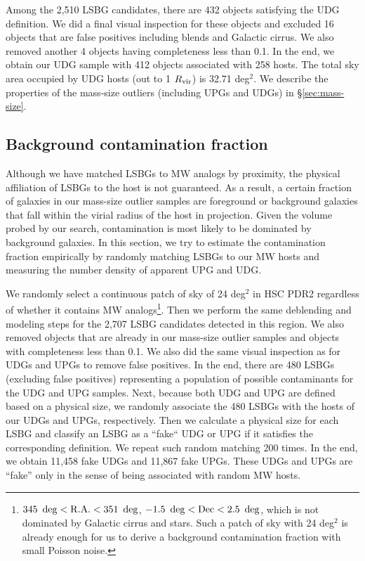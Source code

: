 \documentclass[twocolumn,astrosymb,twocolappendix]{aastex631}
\begin{document}
\begin{CJK*}{UTF8}{gbsn}
Among the 2,510 LSBG candidates, there are 432 objects satisfying the UDG definition. We did a final visual inspection for these objects and excluded 16 objects that are false positives including blends and Galactic cirrus. We also removed another 4 objects having completeness less than 0.1. In the end, we obtain our UDG sample with 412 objects associated with 258 hosts. The total sky area occupied by UDG hosts (out to 1 $R_{\rm{vir}}$) is 32.71 deg$^{2}$. We describe the properties of the mass-size outliers (including UPGs and UDGs) in \S\ref{sec:mass-size}.

\subsection{Background contamination fraction}\label{sec:bkg}
Although we have matched LSBGs to MW analogs by proximity, the physical affiliation of LSBGs to the host is not guaranteed. As a result, a certain fraction of galaxies in our mass-size outlier samples are foreground or background galaxies that fall within the virial radius of the host in projection. Given the volume probed by our search, contamination is most likely to be dominated by background galaxies. In this section, we try to estimate the contamination fraction empirically by randomly matching LSBGs to our MW hosts and measuring the number density of apparent UPG and UDG.

We randomly select a continuous patch of sky of 24 deg$^{2}$ in HSC PDR2 regardless of whether it contains MW analogs\footnote{$345\ \deg < \rm{R.A.} < 351\ \deg$, $-1.5\ \deg < \rm{Dec} < 2.5\ \deg$, which is not dominated by Galactic cirrus and stars. Such a patch of sky with 24 deg$^2$ is already enough for us to derive a background contamination fraction with small Poisson noise.}. Then we perform the same deblending and modeling steps for the 2,707 LSBG candidates detected in this region. We also removed objects that are already in our mass-size outlier samples and objects with completeness less than 0.1. We also did the same visual inspection as for UDGs and UPGs to remove false positives. In the end, there are 480 LSBGs (excluding false positives) representing a population of possible contaminants for the UDG and UPG samples. Next, because both UDG and UPG are defined based on a physical size, we randomly associate the 480 LSBGs with the hosts of our UDGs and UPGs, respectively. Then we calculate a physical size for each LSBG and classify an LSBG as a ``fake`` UDG or UPG if it satisfies the corresponding definition. We repeat such random matching 200 times. In the end, we obtain 11,458 fake UDGs and 11,867 fake UPGs. These UDGs and UPGs are ``fake'' only in the sense of being associated with random MW hosts. 


\end{CJK*}
\end{document}
